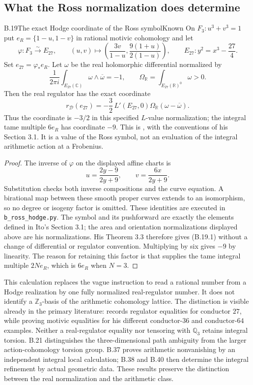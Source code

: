 \subsection{What the Ross normalization does determine}

\begin{statement}{B.19}{The exact Hodge coordinate of the Ross symbol}{Known}
On $F_3:u^3+v^3=1$ put $e_R=\{1-u,1-v\}$ in rational
motivic cohomology and let
\[
 \varphi:F_3\xrightarrow{\sim}E_{27},\qquad
 (u,v)\longmapsto
 \left(\frac{3v}{1-u},\frac{9(1+u)}{2(1-u)}\right),\qquad
 E_{27}:y^2=x^3-\frac{27}{4}.
\]
Set $e_{27}=\varphi_*e_R$. Let $\omega$ be the real
holomorphic differential normalized by
\[
 \frac{1}{2\pi i}\int_{E_{27}(\mathbb C)}
              \omega\wedge\overline\omega=-1,
 \qquad \Omega_{\mathbb R}
          =\int_{E_{27}(\mathbb R)^0}\omega>0.
\]
Then the real regulator has the exact coordinate
\[
 r_{\mathcal D}(e_{27})
   =-\frac32\,L'(E_{27},0)\Omega_{\mathbb R}
                         (\omega-\overline\omega).              \tag{B.19.1}
\]
Thus the coordinate is $-3/2$ in this specified $L$-value
normalization; the integral tame multiple $6e_R$ has
coordinate $-9$. This is \citet[Theorem 3.3]{BIto2018}, with
the conventions of his Section 3.1. It is a value of the
Ross symbol, not an evaluation of the integral arithmetic
action at a Frobenius.
\end{statement}
\begin{proof}
The inverse of $\varphi$ on the displayed affine charts is
\[
          u=\frac{2y-9}{2y+9},\qquad
          v=\frac{6x}{2y+9}.
\]
Substitution checks both inverse compositions and the curve
equation. A birational map between these smooth proper
curves extends to an isomorphism, so no degree or isogeny
factor is omitted. These identities are executed in
\texttt{b\_ross\_hodge.py}.
The symbol and its pushforward are exactly the elements
defined in Ito's Section 3.1; the area and orientation
normalizations displayed above are his normalizations.
His Theorem 3.3 therefore gives (B.19.1) without a change
of differential or regulator convention. Multiplying by six
gives $-9$ by linearity. The reason for retaining this factor
is that \citet[Theorem 1]{BRoss1994} supplies the tame integral
multiple $2N e_R$, which is $6e_R$ when $N=3$.
\end{proof}

This calculation replaces the vague instruction to read a
rational number from a Hodge realization by one fully
normalized real-regulator number. It does not identify a
$\mathbb Z_3$-basis of the arithmetic cohomology lattice.
The distinction is visible already in the primary literature:
\citet[Section 1]{BNemoto2025} records regulator equalities
for conductor $27$, while proving motivic equalities for his
different conductor-$36$ and conductor-$64$ examples.
Neither a real-regulator equality nor tensoring with
$\mathbb Q_3$ retains integral torsion. B.21 distinguishes the
three-dimensional path ambiguity from the larger action-cohomology
torsion group.
B.37 proves arithmetic nonvanishing by an independent
integral local calculation; B.38 and B.40 then determine the
integral refinement by actual geometric data. These results
preserve the distinction between the real normalization and
the arithmetic class.

